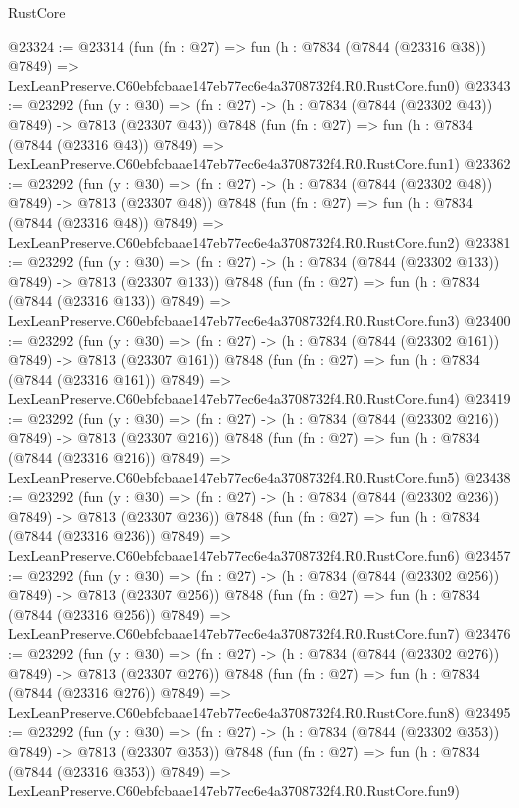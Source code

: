 \begin{lexlean}{RustCore}
\begin{coremodule}
@23324 := @23314
    (fun (fn : @27) =>
    fun (h : @7834 (@7844 (@23316 @38)) @7849) =>
    LexLeanPreserve.C60ebfcbaae147eb77ec6e4a3708732f4.R0.RustCore.fun0)
@23343 := @23292
    (fun (y : @30) => (fn : @27) -> (h : @7834 (@7844 (@23302 @43)) @7849) -> @7813 (@23307 @43))
    @7848
    (fun (fn : @27) =>
    fun (h : @7834 (@7844 (@23316 @43)) @7849) =>
    LexLeanPreserve.C60ebfcbaae147eb77ec6e4a3708732f4.R0.RustCore.fun1)
@23362 := @23292
    (fun (y : @30) => (fn : @27) -> (h : @7834 (@7844 (@23302 @48)) @7849) -> @7813 (@23307 @48))
    @7848
    (fun (fn : @27) =>
    fun (h : @7834 (@7844 (@23316 @48)) @7849) =>
    LexLeanPreserve.C60ebfcbaae147eb77ec6e4a3708732f4.R0.RustCore.fun2)
@23381 := @23292
    (fun (y : @30) => (fn : @27) -> (h : @7834 (@7844 (@23302 @133)) @7849) -> @7813 (@23307 @133))
    @7848
    (fun (fn : @27) =>
    fun (h : @7834 (@7844 (@23316 @133)) @7849) =>
    LexLeanPreserve.C60ebfcbaae147eb77ec6e4a3708732f4.R0.RustCore.fun3)
@23400 := @23292
    (fun (y : @30) => (fn : @27) -> (h : @7834 (@7844 (@23302 @161)) @7849) -> @7813 (@23307 @161))
    @7848
    (fun (fn : @27) =>
    fun (h : @7834 (@7844 (@23316 @161)) @7849) =>
    LexLeanPreserve.C60ebfcbaae147eb77ec6e4a3708732f4.R0.RustCore.fun4)
@23419 := @23292
    (fun (y : @30) => (fn : @27) -> (h : @7834 (@7844 (@23302 @216)) @7849) -> @7813 (@23307 @216))
    @7848
    (fun (fn : @27) =>
    fun (h : @7834 (@7844 (@23316 @216)) @7849) =>
    LexLeanPreserve.C60ebfcbaae147eb77ec6e4a3708732f4.R0.RustCore.fun5)
@23438 := @23292
    (fun (y : @30) => (fn : @27) -> (h : @7834 (@7844 (@23302 @236)) @7849) -> @7813 (@23307 @236))
    @7848
    (fun (fn : @27) =>
    fun (h : @7834 (@7844 (@23316 @236)) @7849) =>
    LexLeanPreserve.C60ebfcbaae147eb77ec6e4a3708732f4.R0.RustCore.fun6)
@23457 := @23292
    (fun (y : @30) => (fn : @27) -> (h : @7834 (@7844 (@23302 @256)) @7849) -> @7813 (@23307 @256))
    @7848
    (fun (fn : @27) =>
    fun (h : @7834 (@7844 (@23316 @256)) @7849) =>
    LexLeanPreserve.C60ebfcbaae147eb77ec6e4a3708732f4.R0.RustCore.fun7)
@23476 := @23292
    (fun (y : @30) => (fn : @27) -> (h : @7834 (@7844 (@23302 @276)) @7849) -> @7813 (@23307 @276))
    @7848
    (fun (fn : @27) =>
    fun (h : @7834 (@7844 (@23316 @276)) @7849) =>
    LexLeanPreserve.C60ebfcbaae147eb77ec6e4a3708732f4.R0.RustCore.fun8)
@23495 := @23292
    (fun (y : @30) => (fn : @27) -> (h : @7834 (@7844 (@23302 @353)) @7849) -> @7813 (@23307 @353))
    @7848
    (fun (fn : @27) =>
    fun (h : @7834 (@7844 (@23316 @353)) @7849) =>
    LexLeanPreserve.C60ebfcbaae147eb77ec6e4a3708732f4.R0.RustCore.fun9)

\end{coremodule}
\end{lexlean}
